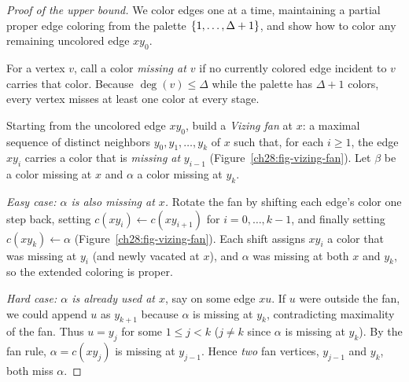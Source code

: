 \begin{proof}[Proof of the upper bound]
We color edges one at a time, maintaining a partial proper edge coloring from the
palette $\{1,\dots,\Delta+1\}$, and show how to color any remaining uncolored edge $xy_0$.

For a vertex $v$, call a color \emph{missing at $v$} if no currently colored edge incident to $v$
carries that color. Because $\deg(v)\le\Delta$ while the palette has $\Delta+1$ colors, every
vertex misses at least one color at every stage.

Starting from the uncolored edge $xy_0$, build a \emph{Vizing fan} at $x$: a maximal sequence of distinct
neighbors $y_0,y_1,\dots,y_k$ of $x$ such that, for each $i\ge 1$, the edge $xy_i$ carries
a color that is \emph{missing at} $y_{i-1}$ (Figure~\ref{ch28:fig-vizing-fan}). Let $\beta$ be a color
missing at $x$ and $\alpha$ a color missing at $y_k$.

\emph{Easy case: $\alpha$ is also missing at $x$.} Rotate the fan by shifting each edge's color one step back, setting
$c(xy_i) \leftarrow c(xy_{i+1})$ for $i=0,\dots,k-1$, and finally setting $c(xy_k)\leftarrow \alpha$ (Figure~\ref{ch28:fig-vizing-fan}). Each shift assigns $xy_i$ a color that was missing at $y_i$ (and newly vacated at $x$), and $\alpha$ was missing at both $x$ and $y_k$, so the extended coloring is proper.

\emph{Hard case: $\alpha$ is already used at $x$}, say on some edge $xu$. If $u$ were outside
the fan, we could append $u$ as $y_{k+1}$ because $\alpha$ is missing at $y_k$, contradicting maximality of the fan. Thus
$u=y_j$ for some $1\le j<k$ ($j\neq k$ since $\alpha$ is missing at $y_k$). By the fan rule,
$\alpha=c(xy_j)$ is missing at $y_{j-1}$. Hence \emph{two} fan vertices,
$y_{j-1}$ and $y_k$, both miss $\alpha$.


\end{proof}
